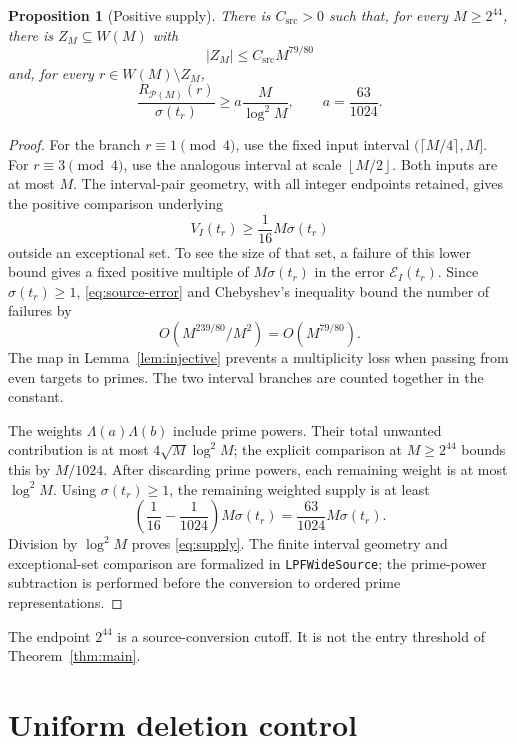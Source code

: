 \documentclass[11pt]{article}
\newtheorem{proposition}[theorem]{Proposition}
\theoremstyle{definition}
\theoremstyle{remark}
\newcommand{\PP}{\mathcal P}
\newcommand{\sig}{\sigma}
\newcommand{\card}[1]{\lvert #1\rvert}
\newcommand{\floor}[1]{\left\lfloor #1\right\rfloor}
\newcommand{\lean}[1]{\nolinkurl{#1}}
\begin{document}
\begin{proposition}[Positive supply]\label{prop:supply}
There is \(C_{\mathrm{src}}>0\) such that, for every \(M\ge2^{44}\),
there is \(Z_M\subseteq W(M)\) with
\[
 \card{Z_M}\le C_{\mathrm{src}}M^{79/80}
\]
and, for every \(r\in W(M)\setminus Z_M\),
\begin{equation}\label{eq:supply}
 \frac{R_{\PP(M)}(r)}{\sig(t_r)}
 \ge a\frac{M}{\log^2 M},\qquad a=\frac{63}{1024}.
\end{equation}
\end{proposition}

\begin{proof}
For the branch \(r\equiv1\pmod4\), use the fixed input interval
\((\lceil M/4\rceil,M]\). For \(r\equiv3\pmod4\), use the analogous
interval at scale \(\floor{M/2}\). Both inputs are at most \(M\).
The interval-pair geometry, with all integer endpoints retained, gives
the positive comparison underlying
\[
 V_I(t_r)\ge \frac1{16}M\sig(t_r)
\]
outside an exceptional set. To see the size of that set, a failure of
this lower bound gives a fixed positive multiple of \(M\sig(t_r)\)
in the error \(\mathcal E_I(t_r)\). Since \(\sig(t_r)\ge1\),
\eqref{eq:source-error} and Chebyshev's inequality bound the number
of failures by
\[
 O(M^{239/80}/M^2)=O(M^{79/80}).
\]
The map in Lemma~\ref{lem:injective} prevents a multiplicity loss when
passing from even targets to primes. The two interval branches are
counted together in the constant.

The weights \(\Lambda(a)\Lambda(b)\) include prime powers. Their
total unwanted contribution is at most
\(4\sqrt M\log^2 M\); the explicit comparison at \(M\ge2^{44}\)
bounds this by \(M/1024\). After discarding prime powers, each
remaining weight is at most \(\log^2M\).
Using \(\sig(t_r)\ge1\), the remaining weighted supply is at least
\[
 \left(\frac1{16}-\frac1{1024}\right)M\sig(t_r)
   =\frac{63}{1024}M\sig(t_r).
\]
Division by \(\log^2M\) proves \eqref{eq:supply}.
The finite interval geometry and exceptional-set comparison are
formalized in \lean{LPFWideSource}; the prime-power subtraction is
performed before the conversion to ordered prime representations.
\end{proof}

The endpoint \(2^{44}\) is a source-conversion cutoff. It is not the
entry threshold of Theorem~\ref{thm:main}.

\section{Uniform deletion control}\label{sec:deletion}
\end{document}
